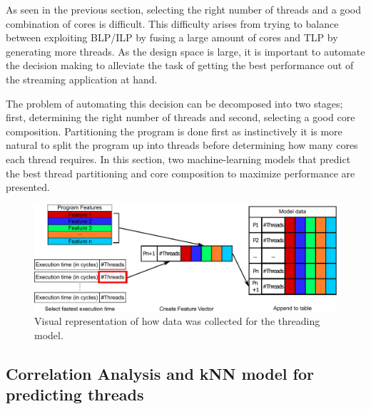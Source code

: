 As seen in the previous section, selecting the right number of threads and a good combination of cores is difficult.
This difficulty arises from trying to balance between exploiting BLP/ILP by fusing a large amount of cores and TLP by generating more threads.
As the design space is large, it is important to automate the decision making to alleviate the task of getting the best performance out of the streaming application at hand.

The problem of automating this decision can be decomposed into two stages; first, determining the right number of threads and second, selecting a good core composition.
Partitioning the program is done first as instinctively it is more natural to split the program up into threads before determining how many cores each thread requires.
In this section, two machine-learning models that predict the best thread partitioning and core composition to maximize performance are presented.

\begin{figure} 
  \centering
 \includegraphics[width=1\textwidth]{streamit-paper/graphics/thread_expl.pdf}
  \caption{Visual representation of how data was collected for the threading model.}\label{fig:thread_expl}
\end{figure}
\subsection{Correlation Analysis and kNN model for predicting threads}

